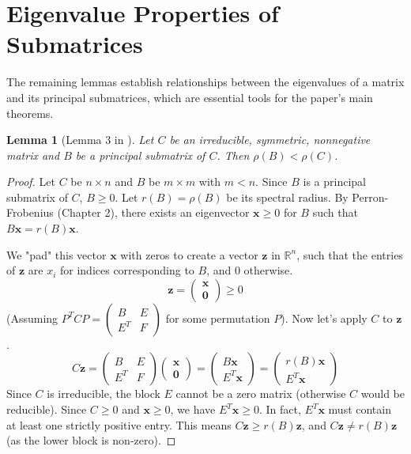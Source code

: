 \documentclass[12pt,a4paper]{report}
\theoremstyle{plain}
\newtheorem{lemma}[theorem]{Lemma}
\theoremstyle{definition}
\theoremstyle{remark}
\begin{document}
\section{Eigenvalue Properties of Submatrices}

The remaining lemmas establish relationships between the eigenvalues of a matrix and its principal submatrices, which are essential tools for the paper's main theorems.

\begin{lemma}[Lemma 3 in \cite{main_paper}]
Let $C$ be an irreducible, symmetric, nonnegative matrix and $B$ be a principal submatrix of $C$. Then $\rho(B) < \rho(C)$.
\end{lemma}
\begin{proof}
Let $C$ be $n \times n$ and $B$ be $m \times m$ with $m < n$.
Since $B$ is a principal submatrix of $C$, $B \ge 0$. Let $r(B) = \rho(B)$ be its spectral radius. By Perron-Frobenius (Chapter 2), there exists an eigenvector $\bm{x} \ge 0$ for $B$ such that $B\bm{x} = r(B)\bm{x}$.

We "pad" this vector $\bm{x}$ with zeros to create a vector $\bm{z}$ in $\mathbb{R}^n$, such that the entries of $\bm{z}$ are $x_i$ for indices corresponding to $B$, and 0 otherwise.
$$ \bm{z} = \begin{pmatrix} \bm{x} \\ \bm{0} \end{pmatrix} \ge 0 $$
(Assuming $P^T C P = \begin{pmatrix} B & E \\ E^T & F \end{pmatrix}$ for some permutation $P$).
Now let's apply $C$ to $\bm{z}$.
$$ C\bm{z} = \begin{pmatrix} B & E \\ E^T & F \end{pmatrix} \begin{pmatrix} \bm{x} \\ \bm{0} \end{pmatrix} = \begin{pmatrix} B\bm{x} \\ E^T \bm{x} \end{pmatrix} = \begin{pmatrix} r(B)\bm{x} \\ E^T \bm{x} \end{pmatrix} $$
Since $C$ is irreducible, the block $E$ cannot be a zero matrix (otherwise $C$ would be reducible). Since $C \ge 0$ and $\bm{x} \ge 0$, we have $E^T \bm{x} \ge 0$. In fact, $E^T \bm{x}$ must contain at least one strictly positive entry.
This means $C\bm{z} \ge r(B)\bm{z}$, and $C\bm{z} \ne r(B)\bm{z}$ (as the lower block is non-zero).


\end{proof}
\end{document}
